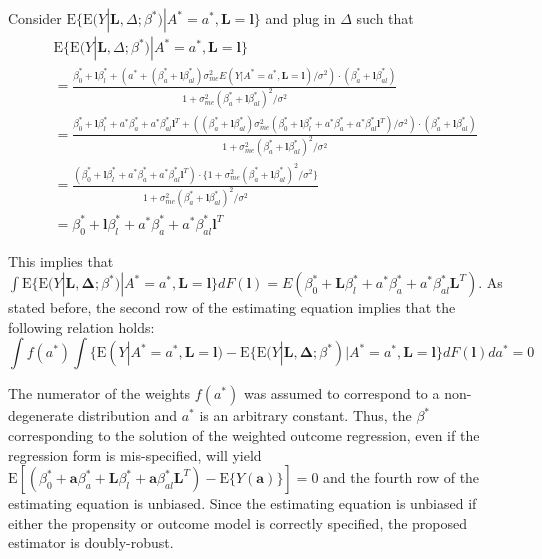 \documentclass[12pt]{article}
\begin{document}
Consider $\text{E} \{ \text{E}(Y | \bm{L}, \Delta; \beta^{*}) | A^{*} = a^{*}, \bm{L} = \bm{l} \}$ and plug in $\Delta$ such that
\begin{align*}
&\text{E} \{ \text{E}(Y | \bm{L}, \Delta; \beta^{*}) | A^{*} = a^{*}, \bm{L} = \bm{l} \} \\
&= \frac{\beta_{0}^{*} + \bm{l}\beta_{l}^{*} + (a^{*} + (\beta_{a}^{*} + \bm{l}\beta_{al}^{*}) \sigma^{2}_{me} E( Y | A^{*} = a^{*}, \bm{L} = \bm{l}) / \sigma^{2}) \cdot (\beta_{a}^{*} + \bm{l}\beta_{al}^{*})}{1 + \sigma^{2}_{me} (\beta_{a}^{*} + \bm{l}\beta_{al}^{*})^{2} / \sigma^{2}} \\
&= \frac{\beta_{0}^{*} + \bm{l}\beta_{l}^{*} + a^{*}\beta_{a}^{*} + a^{*}\beta_{al}^{*}\bm{l}^{T} + ((\beta_{a}^{*} + \bm{l}\beta_{al}^{*}) \sigma^{2}_{me} (\beta_{0}^{*} + \bm{l}\beta_{l}^{*} + a^{*}\beta_{a}^{*} + a^{*}\beta_{al}^{*}\bm{l}^{T}) / \sigma^{2}) \cdot (\beta_{a}^{*} + \bm{l}\beta_{al}^{*})}{1 + \sigma^{2}_{me} (\beta_{a}^{*} + \bm{l}\beta_{al}^{*})^{2} / \sigma^{2}} \\
&= \frac{(\beta_{0}^{*} + \bm{l}\beta_{l}^{*} + a^{*}\beta_{a}^{*} + a^{*}\beta_{al}^{*}\bm{l}^{T}) \cdot \{ 1 + \sigma^{2}_{me} (\beta_{a}^{*} + \bm{l}\beta_{al}^{*})^{2} / \sigma^{2} \}}{1 + \sigma^{2}_{me} (\beta_{a}^{*} + \bm{l}\beta_{al}^{*})^{2} / \sigma^{2}} \\
&= \beta_{0}^{*} + \bm{l}\beta_{l}^{*} + a^{*}\beta_{a}^{*} + a^{*}\beta_{al}^{*}\bm{l}^{T}
\end{align*}

This implies that $\int \text{E} \{ \text{E}(Y | \bm{L}, \bm{\Delta}; \beta^{*}) | A^{*} = a^{*}, \bm{L} = \bm{l} \} dF(\bm{l}) = E(\beta_{0}^{*} + \bm{L}\beta_{l}^{*} + a^{*}\beta_{a}^{*} + a^{*}\beta_{al}^{*}\bm{L}^{T})$. As stated before, the second row of the estimating equation implies that the following relation holds:
\begin{equation*}
\int f(a^{*}) \int \{\text{E}(Y | A^{*} = a^{*}, \bm{L} = \bm{l}) - \text{E} \{ \text{E}(Y | \bm{L}, \bm{\Delta}; \beta^{*}) | A^{*} = a^{*}, \bm{L} = \bm{l} \} dF(\bm{l}) da^{*} = 0
\end{equation*}

The numerator of the weights $f(a^{*})$ was assumed to correspond to a non-degenerate distribution and $a^{*}$ is an arbitrary constant. Thus, the $\beta^{*}$ corresponding to the solution of the weighted outcome regression, even if the regression form is mis-specified, will yield $\text{E}[(\beta^{*}_{0} + \bm{a}\beta^{*}_{a} + \bm{L}\beta^{*}_{l} + \bm{a}\beta^{*}_{al}\bm{L}^{T}) - \text{E} \{ Y(\bm{a}) \}] = 0$ and the fourth row of the estimating equation is unbiased. Since the estimating equation is unbiased if either the propensity or outcome model is correctly specified, the proposed estimator is doubly-robust.
\end{document}
